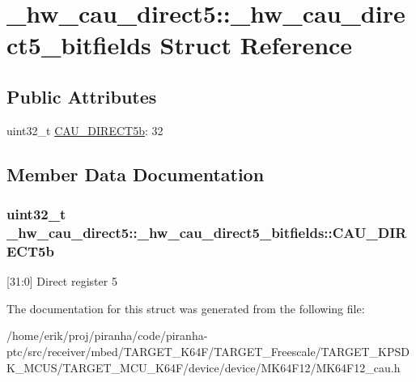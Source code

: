 \hypertarget{struct__hw__cau__direct5_1_1__hw__cau__direct5__bitfields}{}\section{\+\_\+hw\+\_\+cau\+\_\+direct5\+:\+:\+\_\+hw\+\_\+cau\+\_\+direct5\+\_\+bitfields Struct Reference}
\label{struct__hw__cau__direct5_1_1__hw__cau__direct5__bitfields}
\subsection*{Public Attributes}
\begin{DoxyCompactItemize}
\item 
uint32\+\_\+t \hyperlink{struct__hw__cau__direct5_1_1__hw__cau__direct5__bitfields_a9dafc28b71d3bec3d8fd450b50f16b5a}{C\+A\+U\+\_\+\+D\+I\+R\+E\+C\+T5b}\+: 32
\end{DoxyCompactItemize}


\subsection{Member Data Documentation}
\subsubsection[{\texorpdfstring{C\+A\+U\+\_\+\+D\+I\+R\+E\+C\+T5b}{CAU_DIRECT5b}}]{\setlength{\rightskip}{0pt plus 5cm}uint32\+\_\+t \+\_\+hw\+\_\+cau\+\_\+direct5\+::\+\_\+hw\+\_\+cau\+\_\+direct5\+\_\+bitfields\+::\+C\+A\+U\+\_\+\+D\+I\+R\+E\+C\+T5b}\hypertarget{struct__hw__cau__direct5_1_1__hw__cau__direct5__bitfields_a9dafc28b71d3bec3d8fd450b50f16b5a}{}\label{struct__hw__cau__direct5_1_1__hw__cau__direct5__bitfields_a9dafc28b71d3bec3d8fd450b50f16b5a}
\mbox{[}31\+:0\mbox{]} Direct register 5 

The documentation for this struct was generated from the following file\+:\begin{DoxyCompactItemize}
\item 
/home/erik/proj/piranha/code/piranha-\/ptc/src/receiver/mbed/\+T\+A\+R\+G\+E\+T\+\_\+\+K64\+F/\+T\+A\+R\+G\+E\+T\+\_\+\+Freescale/\+T\+A\+R\+G\+E\+T\+\_\+\+K\+P\+S\+D\+K\+\_\+\+M\+C\+U\+S/\+T\+A\+R\+G\+E\+T\+\_\+\+M\+C\+U\+\_\+\+K64\+F/device/device/\+M\+K64\+F12/M\+K64\+F12\+\_\+cau.\+h\end{DoxyCompactItemize}
